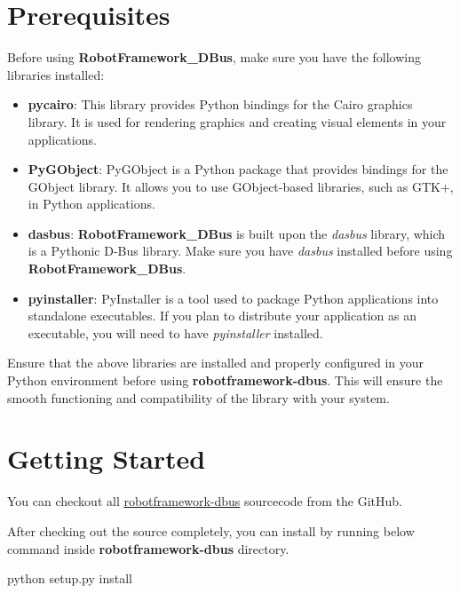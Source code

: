 %
%


\hypertarget{prerequisites}{%
\section{Prerequisites}\label{prerequisites}}

Before using \textbf{RobotFramework\_DBus}, make sure you have the following libraries installed:

\begin{itemize}
  \item \textbf{pycairo}: This library provides Python bindings for the Cairo graphics library. It is used for rendering graphics and creating visual elements in your applications.
  \item \textbf{PyGObject}: PyGObject is a Python package that provides bindings for the GObject library. It allows you to use GObject-based libraries, such as GTK+, in Python applications.
  \item \textbf{dasbus}: \textbf{RobotFramework\_DBus} is built upon the \textit{dasbus} library, which is a Pythonic D-Bus library. Make sure you have \textit{dasbus} installed before using \textbf{RobotFramework\_DBus}.
  \item \textbf{pyinstaller}: PyInstaller is a tool used to package Python applications into standalone executables. If you plan to distribute your application as an executable, you will need to have \textit{pyinstaller} installed.
\end{itemize}

Ensure that the above libraries are installed and properly configured in your Python environment before using \textbf{robotframework-dbus}. This will ensure the smooth functioning and compatibility of the library with your system.

\hypertarget{getting-started}{%
\section{Getting Started}\label{getting-started}}

You can checkout all
\href{https://github.com/test-fullautomation/robotframework-dbus/}{robotframework-dbus}
sourcecode from the GitHub.

After checking out the source completely, you can install by running
below command inside \textbf{robotframework-dbus} directory.

\begin{robotlog}
python setup.py install
\end{robotlog}

